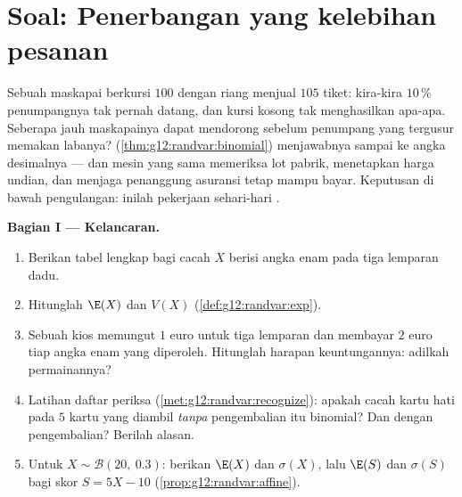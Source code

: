 \section{Soal: Penerbangan yang kelebihan pesanan}

\begin{problem}
\label{pb:g12:randvar:1}
Sebuah maskapai berkursi $100$ dengan riang menjual $105$ tiket: kira-kira
$10\,\%$ penumpangnya tak pernah datang, dan kursi kosong tak menghasilkan
apa-apa. Seberapa jauh maskapainya dapat mendorong sebelum penumpang yang tergusur
memakan labanya? 
(\cref{thm:g12:randvar:binomial}) menjawabnya sampai ke angka desimalnya --- dan
mesin yang sama memeriksa lot pabrik, menetapkan harga undian, dan
menjaga penanggung asuransi tetap mampu bayar. Keputusan di bawah pengulangan: inilah
pekerjaan sehari-hari .

\medskip
\noindent\textbf{Bagian I --- Kelancaran.}
\begin{enumerate}
  \item Berikan tabel  lengkap bagi cacah $X$ berisi
        angka enam pada tiga lemparan dadu.
  \item Hitunglah $\E(X)$ dan $V(X)$
        (\cref{def:g12:randvar:exp}).
  \item Sebuah kios memungut $1$ euro untuk tiga lemparan dan membayar $2$
        euro tiap angka enam yang diperoleh. Hitunglah harapan keuntungannya: adilkah
        permainannya?
  \item Latihan daftar periksa (\cref{met:g12:randvar:recognize}):
        apakah cacah kartu hati pada $5$ kartu yang diambil
        \emph{tanpa} pengembalian itu binomial? Dan dengan pengembalian?
        Berilah alasan.
  \item Untuk $X \sim \mathcal B(20,\ 0.3)$: berikan $\E(X)$ dan
        $\sigma(X)$, lalu $\E(S)$ dan $\sigma(S)$ bagi skor
        $S = 5X - 10$ (\cref{prop:g12:randvar:affine}).
\end{enumerate}


\end{problem}
